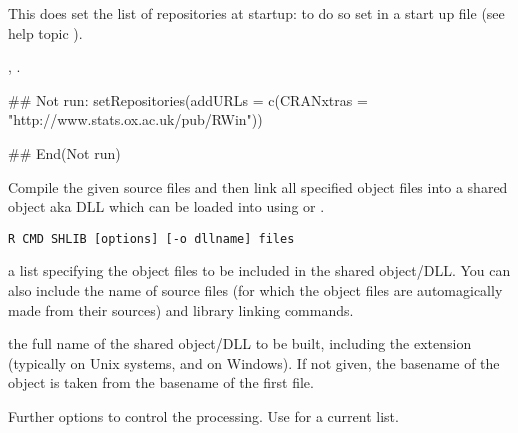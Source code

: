 %
\begin{Note}\relax
This does  set the list of repositories at startup: to do
so set  in a start up file (see help topic
).
\end{Note}
%
\begin{SeeAlso}\relax
{}, .
\end{SeeAlso}
%
\begin{Examples}
\begin{ExampleCode}
## Not run: 
setRepositories(addURLs =
                c(CRANxtras = "http://www.stats.ox.ac.uk/pub/RWin"))

## End(Not run)
\end{ExampleCode}
\end{Examples}
%
\begin{Description}\relax
Compile the given source files and then link all specified object
files into a shared object aka DLL which can be loaded into \R{} using
 or .
\end{Description}
%
\begin{Usage}
\begin{verbatim}
R CMD SHLIB [options] [-o dllname] files
\end{verbatim}
\end{Usage}
%
\begin{Arguments}
\begin{ldescription}
\item[\code{files}] a list specifying the object files to be included in the
shared object/DLL.  You can also include the name of source files (for
which the object files are automagically made from their sources)
and library linking commands.

\item[\code{dllname}] the full name of the shared object/DLL to be built,
including the extension (typically  on Unix systems, and
 on Windows).  If not given, the basename of the object
is taken from the basename of the first file.
\item[\code{options}] Further options to control the processing.  Use
 for a current list.

\end{ldescription}
\end{Arguments}

